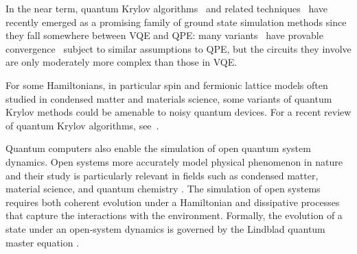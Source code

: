 In the near term, quantum Krylov algorithms~\cite{mcclean2017subspace,colless2018computation,parrish2019filterdiagonalization,motta2020qite_qlanczos,takeshita2020subspace,huggins2020nonorthogonal,stair2020krylov,urbanek2020chemistry,cohn2021filterdiagonalization,yoshioka2021virtualsubspace,seki2021powermethod,cortes2022krylov,klymko2022realtime,baek2023say,tkachenko2022davidson,lee2023sampling,zhang2023measurementefficient,kirby2023exactefficient,shen2023realtimekrylov,motta2023subspace} and related techniques~\cite{shen2023estimating} have recently emerged as a promising family of ground state simulation methods since they fall somewhere between VQE and QPE: many variants~\cite{parrish2019filterdiagonalization,motta2020qite_qlanczos,stair2020krylov,urbanek2020chemistry,cohn2021filterdiagonalization,epperly2021subspacediagonalization,seki2021powermethod,cortes2022krylov,klymko2022realtime,tkachenko2022davidson,zhang2023measurementefficient,lee2023sampling,kirby2023exactefficient,shen2023realtimekrylov} have provable convergence~\cite{epperly2021subspacediagonalization,kirby2023exactefficient,zhang2023measurementefficient,motta2023subspace} subject to similar assumptions to QPE, but the circuits they involve are only moderately more complex than those in VQE.

For some Hamiltonians, in particular spin and fermionic lattice models often studied in condensed matter and materials science, some variants of quantum Krylov methods could be amenable to noisy quantum devices.
For a recent review of quantum Krylov algorithms, see~\cite{motta2023subspace}.
 
Quantum computers also enable the simulation of open quantum system dynamics. Open systems more accurately model physical phenomenon in nature and their study is particularly relevant in fields such as condensed matter, material science, and quantum chemistry \cite{olmos2012facilitated, may2023charge, nitzan2006chemical, kastoryano2023quantum,ding2023single, cubitt2023dissipative, hubisz2021quantum,schlimgen2022quantum}. The simulation of open systems requires both coherent evolution under a Hamiltonian and dissipative processes that capture the interactions with the environment. Formally, the evolution of a state under an open-system dynamics is governed by the Lindblad quantum master equation \cite{lindblad1976generators}.


